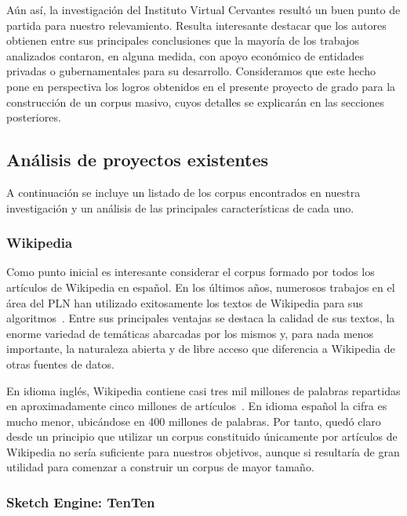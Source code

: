 Aún así, la investigación del Instituto Virtual Cervantes resultó un buen punto de partida para nuestro
relevamiento. Resulta interesante destacar que los autores obtienen entre sus principales conclusiones
que la mayoría de los trabajos analizados contaron, en alguna medida, con apoyo económico de entidades
privadas o gubernamentales para su desarrollo. Consideramos que este hecho pone en perspectiva los logros
obtenidos en el presente proyecto de grado para la construcción de un corpus masivo, cuyos detalles se
explicarán en las secciones posteriores.

\subsection{Análisis de proyectos existentes}

A continuación se incluye un listado de los corpus encontrados en nuestra investigación y un análisis de
las principales características de cada uno.

\subsubsection{Wikipedia}

Como punto inicial es interesante considerar el corpus formado por todos los artículos de Wikipedia en
español. En los últimos años, numerosos trabajos en el área del PLN han utilizado exitosamente los
textos de Wikipedia para sus algoritmos~\cite{WikipediaNLP}. Entre sus principales ventajas se destaca
la calidad de sus textos, la enorme variedad de temáticas abarcadas por los mismos y, para nada menos
importante, la naturaleza abierta y de libre acceso que diferencia a Wikipedia de otras fuentes de datos.

En idioma inglés, Wikipedia contiene casi tres mil millones de palabras repartidas en aproximadamente
cinco millones de artículos~\cite{WikipediaSize}. En idioma español la cifra es mucho menor, ubicándose en
400 millones de palabras. Por tanto, quedó claro desde un principio que utilizar un corpus constituido
únicamente por artículos de Wikipedia no sería suficiente para nuestros objetivos, aunque si resultaría de
gran utilidad para comenzar a construir un corpus de mayor tamaño.

\subsubsection{Sketch Engine: TenTen}

